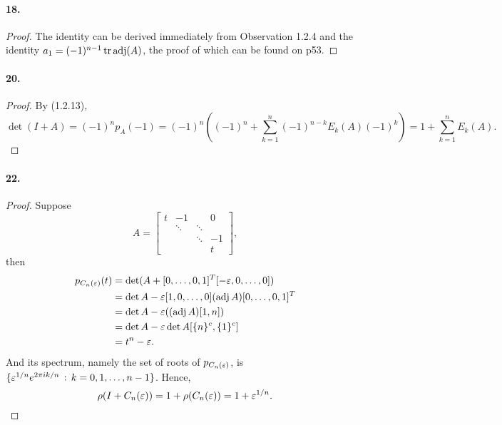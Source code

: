   \paragraph{18.}
  \begin{proof}
    The identity can be derived immediately from Observation 1.2.4 and the 
    identity $a_1 = (-1)^{n-1}\operatorname{tr}\operatorname{adj}(A)$, the proof of which can be found on 
    p53.
  \end{proof}

  \paragraph{20.}
  \begin{proof}
    By (1.2.13), 
    \[
      \det(I+A) = (-1)^n p_A(-1) = 
      (-1)^n\left((-1)^n + \sum_{k=1}^n(-1)^{n-k}E_k(A)(-1)^k \right)
      = 1 + \sum_{k=1}^n E_k(A).
    \]
  \end{proof}

  \paragraph{22.} 
  \begin{proof}
    Suppose
    \[
      A = 
      \begin{bmatrix}
        t    & -1     &        & 0 \\
             & \ddots & \ddots &   \\
             &        & \ddots & -1 \\
             &        &        & t
      \end{bmatrix},
    \]
    then
    \begin{align*}
      p_{C_n(\varepsilon)}(t)
      &= \det(A + [0,\dots,0,1]^T [-\varepsilon,0,\dots,0]) \\
      &= \det A - \varepsilon [1, 0,\dots,0](\operatorname{adj} A) [0,\dots,0,1]^T \\
      &= \det A - \varepsilon ((\operatorname{adj} A)[1,n]) \\
      &= \det A - \varepsilon \det A[\{n\}^c, \{1\}^c] \\
      &= t^n - \varepsilon.
    \end{align*}
    And its spectrum, namely the set of roots of $p_{C_n(\varepsilon)}$, is $\{
    \varepsilon^{1/n} e^{2\pi ik/n}\,:\,k=0,1,\dots,n-1\}$. Hence,
    \[
      \rho(I+C_n(\varepsilon)) = 1 + \rho(C_n(\varepsilon)) = 1+\varepsilon^{1/n}.
    \]
  \end{proof}  


